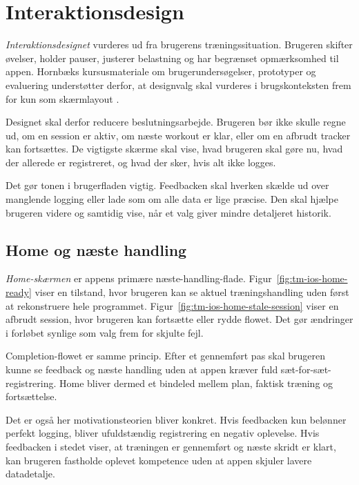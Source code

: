 \section{Interaktionsdesign}

\emph{Interaktionsdesignet} vurderes ud fra brugerens træningssituation. Brugeren skifter øvelser, holder pauser, justerer belastning og har begrænset opmærksomhed til appen. Hornbæks kursusmateriale om brugerundersøgelser, prototyper og evaluering understøtter derfor, at designvalg skal vurderes i brugskonteksten frem for kun som skærmlayout \cite{hornbaek2024_brugerundersoegelser,hornbaek2024_prototyper,hornbaek2024_evaluering}.

Designet skal derfor reducere beslutningsarbejde. Brugeren bør ikke skulle regne ud, om en session er aktiv, om næste workout er klar, eller om en afbrudt tracker kan fortsættes. De vigtigste skærme skal vise, hvad brugeren skal gøre nu, hvad der allerede er registreret, og hvad der sker, hvis alt ikke logges.

Det gør tonen i brugerfladen vigtig. Feedbacken skal hverken skælde ud over manglende logging eller lade som om alle data er lige præcise. Den skal hjælpe brugeren videre og samtidig vise, når et valg giver mindre detaljeret historik.

\subsection{Home og næste handling}

\emph{Home-skærmen} er appens primære næste-handling-flade. Figur~\ref{fig:tm-ios-home-ready} viser en tilstand, hvor brugeren kan se aktuel træningshandling uden først at rekonstruere hele programmet. Figur~\ref{fig:tm-ios-home-stale-session} viser en afbrudt session, hvor brugeren kan fortsætte eller rydde flowet. Det gør ændringer i forløbet synlige som valg frem for skjulte fejl.

Completion-flowet er samme princip. Efter et gennemført pas skal brugeren kunne se feedback og næste handling uden at appen kræver fuld sæt-for-sæt-registrering. Home bliver dermed et bindeled mellem plan, faktisk træning og fortsættelse.

Det er også her motivationsteorien bliver konkret. Hvis feedbacken kun belønner perfekt logging, bliver ufuldstændig registrering en negativ oplevelse. Hvis feedbacken i stedet viser, at træningen er gennemført og næste skridt er klart, kan brugeren fastholde oplevet kompetence uden at appen skjuler lavere datadetalje.

